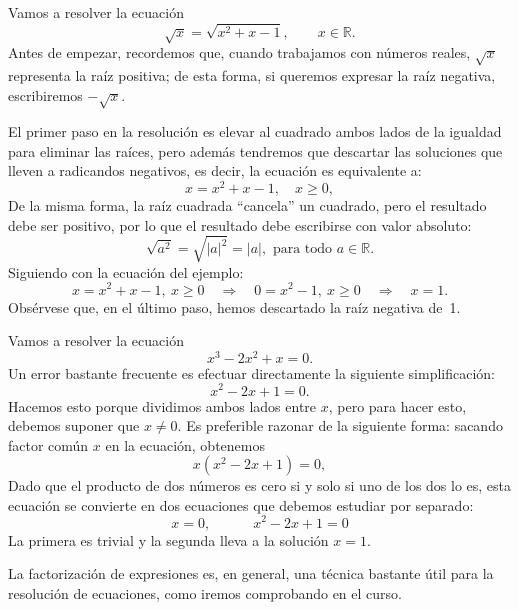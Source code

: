 \begin{ejemplo}
Vamos a resolver la ecuación
\[
\sqrt{x}= \sqrt{x^2+x-1},\qquad x\in \mathbb{R}.
\]
Antes de empezar, recordemos que, cuando trabajamos con números reales, $\sqrt{x}$ representa la raíz positiva; 
de esta forma, si queremos expresar la raíz negativa, escribiremos $-\sqrt{x}$.

El primer paso en la resolución es elevar al cuadrado ambos lados de la igualdad para eliminar las raíces, pero además tendremos que descartar las soluciones que lleven a radicandos negativos, es decir, la ecuación es equivalente a:
\[
x= x^2+x-1,\quad x\ge 0,
\]
De la misma forma, la raíz cuadrada ``cancela'' un cuadrado, pero el resultado debe ser positivo, por lo que el resultado debe escribirse con valor absoluto:
\[
\sqrt{a^2} = \sqrt{|a|^2}=|a|, \text{ para todo } a\in\mathbb{R}.
\]
Siguiendo con la ecuación del ejemplo:
\[
x= x^2+x-1,\ x\ge0 \quad\Rightarrow\quad 0= x^2-1,\ x\ge 0\quad\Rightarrow\quad x=1.
\]
Obsérvese que, en el último paso, hemos descartado la raíz negativa de~1.\fej
\end{ejemplo}
%
\begin{ejemplo}
Vamos a resolver la ecuación
\[
x^3- 2x^2+x=0.
\]
Un error bastante frecuente es efectuar directamente la siguiente simplificación:
\[
x^2-2x+1=0.
\]
Hacemos esto porque dividimos ambos lados entre $x$, pero para hacer esto, debemos suponer que $x\ne0$.
Es preferible razonar de la siguiente forma:
sacando factor común $x$ en la ecuación, obtenemos
\[
x(x^2-2x+1)=0,
\]
Dado que el producto de dos números es cero si y solo si uno de los dos lo es, esta ecuación se convierte en dos ecuaciones que debemos estudiar por separado:
\[
x=0,\qquad\quad x^2-2x+1=0
\]
La primera es trivial y la segunda lleva a la solución $x=1$.

La factorización de expresiones es, en general, una técnica bastante útil para la resolución de ecuaciones, como iremos comprobando en el curso.\fej
\end{ejemplo}
%

